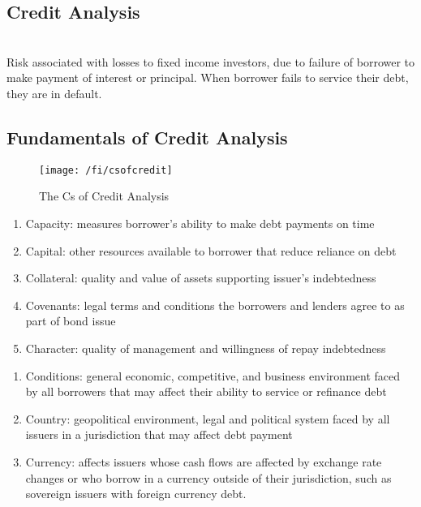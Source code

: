 \subsection{Credit Analysis}

\begin{definition} \\
Risk associated with losses to fixed income investors, due to failure of borrower to make payment of interest or principal. When borrower fails to service their debt, they are in default.
\end{definition}

\subsection{Fundamentals of Credit Analysis}

\begin{figure}[H]
\centering
\texttt{[image: /fi/csofcredit]}
\caption{The Cs of Credit Analysis}
\end{figure}

\begin{remark} 
\begin{enumerate}[label=\roman*.]
\setlength{\itemsep}{0pt}
\item Capacity: measures borrower's ability to make debt payments on time
\item Capital: other resources available to borrower that reduce reliance on debt
\item Collateral: quality and value of assets supporting issuer's indebtedness
\item Covenants: legal terms and conditions the borrowers and lenders agree to as part of bond issue
\item Character: quality of management and willingness of repay indebtedness
\end{enumerate}
\end{remark}

\begin{remark} 
\begin{enumerate}[label=\roman*.]
\setlength{\itemsep}{0pt}
\item Conditions: general economic, competitive, and business environment faced by all borrowers that may affect their ability to service or refinance debt
\item Country: geopolitical environment, legal and political system faced by all issuers in a jurisdiction that may affect debt payment
\item Currency: affects issuers whose cash flows are affected by exchange rate changes or who borrow in a currency outside of their jurisdiction, such as sovereign issuers with foreign currency debt.
\end{enumerate}
\end{remark}

